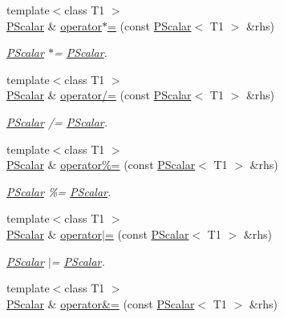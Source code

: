 \begin{DoxyCompactItemize}
{\footnotesize template$<$class T1 $>$ }\\\mbox{\hyperlink{classENSEM_1_1PScalar}{P\+Scalar}} \& \mbox{\hyperlink{classENSEM_1_1PScalar_addccfa9164f9d80554657387932185c4}{operator$\ast$=}} (const \mbox{\hyperlink{classENSEM_1_1PScalar}{P\+Scalar}}$<$ T1 $>$ \&rhs)
\begin{DoxyCompactList}\small\item\em \mbox{\hyperlink{classENSEM_1_1PScalar}{P\+Scalar}} $\ast$= \mbox{\hyperlink{classENSEM_1_1PScalar}{P\+Scalar}}. \end{DoxyCompactList}\item 
{\footnotesize template$<$class T1 $>$ }\\\mbox{\hyperlink{classENSEM_1_1PScalar}{P\+Scalar}} \& \mbox{\hyperlink{classENSEM_1_1PScalar_a72bf5e7494fc6c8831d0003f8fb62a16}{operator/=}} (const \mbox{\hyperlink{classENSEM_1_1PScalar}{P\+Scalar}}$<$ T1 $>$ \&rhs)
\begin{DoxyCompactList}\small\item\em \mbox{\hyperlink{classENSEM_1_1PScalar}{P\+Scalar}} /= \mbox{\hyperlink{classENSEM_1_1PScalar}{P\+Scalar}}. \end{DoxyCompactList}\item 
{\footnotesize template$<$class T1 $>$ }\\\mbox{\hyperlink{classENSEM_1_1PScalar}{P\+Scalar}} \& \mbox{\hyperlink{classENSEM_1_1PScalar_ab583ff2667eba7d2bed2acbd3c15e43e}{operator\%=}} (const \mbox{\hyperlink{classENSEM_1_1PScalar}{P\+Scalar}}$<$ T1 $>$ \&rhs)
\begin{DoxyCompactList}\small\item\em \mbox{\hyperlink{classENSEM_1_1PScalar}{P\+Scalar}} \%= \mbox{\hyperlink{classENSEM_1_1PScalar}{P\+Scalar}}. \end{DoxyCompactList}\item 
{\footnotesize template$<$class T1 $>$ }\\\mbox{\hyperlink{classENSEM_1_1PScalar}{P\+Scalar}} \& \mbox{\hyperlink{classENSEM_1_1PScalar_a59ee3adbb8dabcfb25aae9f9390dcef0}{operator$\vert$=}} (const \mbox{\hyperlink{classENSEM_1_1PScalar}{P\+Scalar}}$<$ T1 $>$ \&rhs)
\begin{DoxyCompactList}\small\item\em \mbox{\hyperlink{classENSEM_1_1PScalar}{P\+Scalar}} $\vert$= \mbox{\hyperlink{classENSEM_1_1PScalar}{P\+Scalar}}. \end{DoxyCompactList}\item 
{\footnotesize template$<$class T1 $>$ }\\\mbox{\hyperlink{classENSEM_1_1PScalar}{P\+Scalar}} \& \mbox{\hyperlink{classENSEM_1_1PScalar_a9c683c36c7129b6b016af09f8d5cda42}{operator\&=}} (const \mbox{\hyperlink{classENSEM_1_1PScalar}{P\+Scalar}}$<$ T1 $>$ \&rhs)

\end{DoxyCompactItemize}
